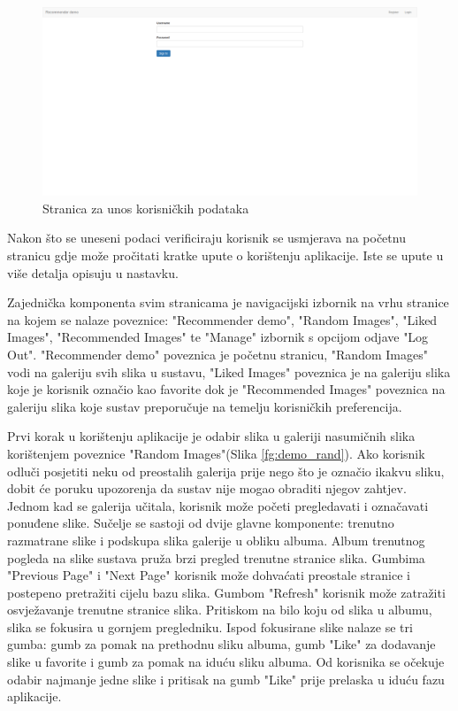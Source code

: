 \documentclass[times, utf8, proizvoljni, numeric]{fer}
\begin{document}
\begin{figure}[!ht]
	\begin{center}
		\captionsetup{justification=centering}
		\includegraphics[width=1.0\textwidth]{./imgs/demo-preporucitelja-po-sadrzaju/tijek-rada/demo-login.png}
		\caption{Stranica za unos korisničkih podataka}
		\label{fg:demo_login}
	\end{center}
\end{figure}

Nakon što se uneseni podaci verificiraju korisnik se usmjerava na početnu stranicu gdje može pročitati kratke upute o korištenju aplikacije. Iste se upute u više detalja opisuju u nastavku.

Zajednička komponenta svim stranicama je navigacijski izbornik na vrhu stranice na kojem se nalaze poveznice: "Recommender demo", "Random Images", "Liked Images", "Recommended Images" te "Manage" izbornik s opcijom odjave "Log Out". "Recommender demo" poveznica je početnu stranicu, "Random Images" vodi na galeriju svih slika u sustavu, "Liked Images" poveznica je na galeriju slika koje je korisnik označio kao favorite dok je "Recommended Images" poveznica na galeriju slika koje sustav preporučuje na temelju korisničkih preferencija.

Prvi korak u korištenju aplikacije je odabir slika u galeriji nasumičnih slika korištenjem poveznice "Random Images"(Slika \ref{fg:demo_rand}). Ako korisnik odluči posjetiti neku od preostalih galerija prije nego što je označio ikakvu sliku, dobit će poruku upozorenja da sustav nije mogao obraditi njegov zahtjev. Jednom kad se galerija učitala, korisnik može početi pregledavati i označavati ponuđene slike. Sučelje se sastoji od dvije glavne komponente: trenutno razmatrane slike i podskupa slika galerije u obliku albuma. Album trenutnog pogleda na slike sustava pruža brzi pregled trenutne stranice slika. Gumbima "Previous Page" i "Next Page" korisnik može dohvaćati preostale stranice i postepeno pretražiti cijelu bazu slika. Gumbom "Refresh" korisnik može zatražiti osvježavanje trenutne stranice slika. Pritiskom na bilo koju od slika u albumu, slika se fokusira u gornjem pregledniku. Ispod fokusirane slike nalaze se tri gumba: gumb za pomak na prethodnu sliku albuma, gumb "Like" za dodavanje slike u favorite i gumb za pomak na iduću sliku albuma. Od korisnika se očekuje odabir najmanje jedne slike i pritisak na gumb "Like" prije prelaska u iduću fazu aplikacije.
\end{document}
